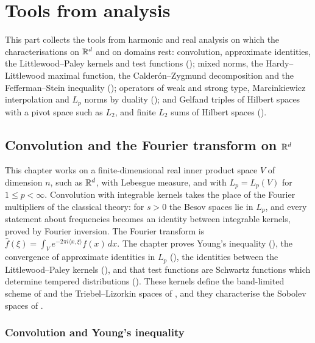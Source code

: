 
\part{Tools from analysis}
\label{part:analysis}

This part collects the tools from harmonic and real analysis on which the characterisations on
$\mathbb{R}^d$ and on domains rest: convolution, approximate identities, the Littlewood--Paley kernels and
test functions (); mixed norms, the Hardy--Littlewood maximal function, the
Calder\'on--Zygmund decomposition and the Fefferman--Stein inequality
(); operators of weak and strong type, Marcinkiewicz interpolation
and $L_p$ norms by duality (); and Gelfand triples of Hilbert
spaces with a pivot space such as $L_2$, and finite $L_2$ sums of Hilbert spaces
().

\chapter{Convolution and the Fourier transform on \texorpdfstring{$\mathbb{R}^d$}{R\^{}d}}
\label{ch:fourier-rd}

This chapter works on a finite-dimensional real inner product space $V$ of dimension $n$, such
as $\mathbb{R}^d$, with Lebesgue measure, and with $L_p = L_p(V)$ for $1 \leq p < \infty$. Convolution
with integrable kernels takes the place of the Fourier multipliers of the classical theory: for
$s > 0$ the Besov spaces lie in $L_p$, and every statement about frequencies becomes an identity
between integrable kernels, proved by Fourier inversion. The Fourier transform is
$\widehat f(\xi) = \int_V e^{-2\pi i \langle x, \xi \rangle} f(x) \, dx$. The chapter proves
Young's inequality (), the convergence of approximate identities in $L_p$
(), the identities between the Littlewood--Paley kernels
(), and that test functions are Schwartz functions which determine
tempered distributions (). These kernels define the
band-limited scheme of  and the Triebel--Lizorkin spaces of
, and they characterise the Sobolev spaces of .

\section{Convolution and Young's inequality}

